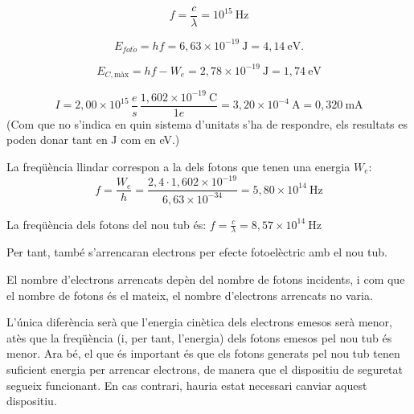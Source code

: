 \begin{solapartat}
\[ f = \frac{c}{\lambda} = 10^{15}\ \mathrm{Hz} \]

\[ E_{fot\acute{o}} = hf = 6,63\times 10^{-19}\ \mathrm{J} = 4,14\ \mathrm{eV}. \]

\[ E_{C,\text{màx}} = hf - W_e = 2,78\times 10^{-19}\ \mathrm{J} = 1,74\ \mathrm{eV} \]

\[ I = 2,00\times 10^{15}\,\frac{e}{s}\,\frac{1,602\times 10^{-19}\ \mathrm{C}}{1e} = 3,20\times 10^{-4}\ \mathrm{A} = 0,320\ \mathrm{mA} \]
(Com que no s'indica en quin sistema d'unitats s'ha de respondre, els resultats es poden donar tant en J com en eV.)
\end{solapartat}

\begin{solapartat}
 La freqüència llindar correspon a la dels fotons que tenen una energia $W_e$:
\[ f = \frac{W_e}{h} = \frac{2,4\cdot 1,602\times 10^{-19}}{6,63\times 10^{-34}} = 5,80\times 10^{14}\ \mathrm{Hz} \]

 La freqüència dels fotons del nou tub és: $f = \frac{c}{\lambda} = 8,57\times 10^{14}\ \mathrm{Hz}$

 Per tant, també s'arrencaran electrons per efecte fotoelèctric amb el nou tub.

 El nombre d'electrons arrencats depèn del nombre de fotons incidents, i com que el nombre de fotons és el mateix, el nombre d'electrons arrencats no varia.

 L'única diferència serà que l'energia cinètica dels electrons emesos serà menor, atès que la freqüència (i, per tant, l'energia) dels fotons emesos pel nou tub és menor. Ara bé, el que és important és que els fotons generats pel nou tub tenen suficient energia per arrencar electrons, de manera que el dispositiu de seguretat segueix funcionant. En cas contrari, hauria estat necessari canviar aquest dispositiu.
\end{solapartat}
